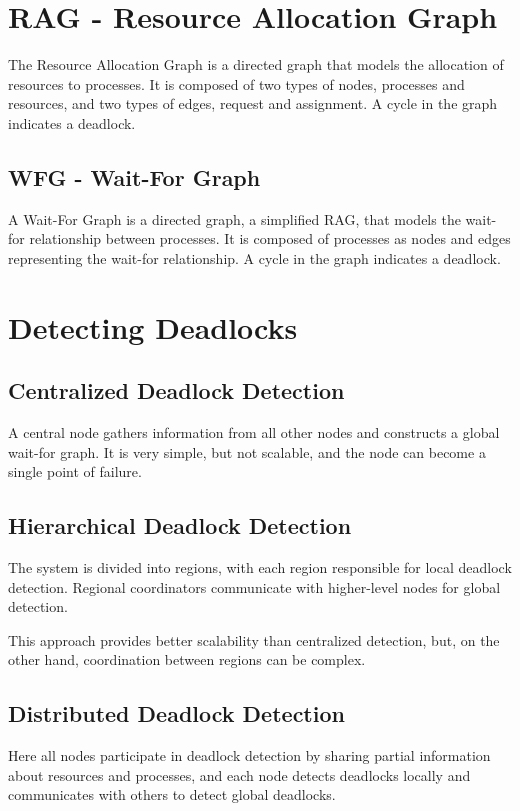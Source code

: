 \section{RAG - Resource Allocation Graph}
The Resource Allocation Graph is a directed graph that models the allocation of resources to processes. It is composed of two types of nodes, processes and resources, and two types of edges, request and assignment. 
A cycle in the graph indicates a deadlock.

\subsection{WFG - Wait-For Graph}
A Wait-For Graph is a directed graph, a simplified RAG, that models the wait-for relationship between processes. It is composed of processes as nodes and edges representing the wait-for relationship. A cycle in the graph indicates a deadlock.

\section{Detecting Deadlocks}
\subsection{Centralized Deadlock Detection}
A central node gathers information from all other nodes and constructs a global wait-for graph.
It is very simple, but not scalable, and the node can become a single point of failure.
\subsection{Hierarchical Deadlock Detection}
The system is divided into regions, with each region responsible for local deadlock detection.  Regional coordinators communicate with higher-level nodes for global detection.

This approach provides better scalability than centralized detection, but, on the other hand, coordination between regions can be complex.
\subsection{Distributed Deadlock Detection}

Here all nodes participate in deadlock detection by sharing partial information about resources and processes, and each node detects deadlocks locally and communicates with others to detect global deadlocks.

